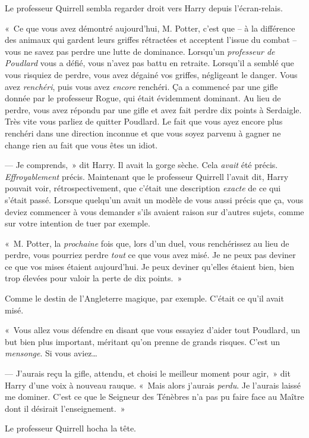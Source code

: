 Le professeur Quirrell sembla regarder droit vers Harry depuis l'écran-relais.

«~Ce que vous avez démontré aujourd'hui, M. Potter, c'est que -- à la différence des animaux qui gardent leurs griffes rétractées et acceptent l'issue du combat -- vous ne savez pas perdre une lutte de dominance. Lorsqu'un \emph{professeur de Poudlard} vous a défié, vous n'avez pas battu en retraite. Lorsqu'il a semblé que vous risquiez de perdre, vous avez dégainé vos griffes, négligeant le danger. Vous avez \emph{renchéri}, puis vous avez \emph{encore} renchéri. Ça a commencé par une gifle donnée par le professeur Rogue, qui était évidemment dominant. Au lieu de perdre, vous avez répondu par une gifle et avez fait perdre dix points à Serdaigle. Très vite vous parliez de quitter Poudlard. Le fait que vous ayez encore plus renchéri dans une direction inconnue et que vous soyez parvenu à gagner ne change rien au fait que vous êtes un idiot.

--- Je comprends,~» dit Harry. Il avait la gorge sèche. Cela \emph{avait} été précis. \emph{Effroyablement} précis. Maintenant que le professeur Quirrell l'avait dit, Harry pouvait voir, rétrospectivement, que c'était une description \emph{exacte} de ce qui s'était passé. Lorsque quelqu'un avait un modèle de vous aussi précis que ça, vous deviez commencer à vous demander s'ils avaient raison sur d'autres sujets, comme sur votre intention de tuer par exemple.

«~M. Potter, la \emph{prochaine} fois que, lors d'un duel, vous renchérissez au lieu de perdre, vous pourriez perdre \emph{tout} ce que vous avez misé. Je ne peux pas deviner ce que vos mises étaient aujourd'hui. Je peux deviner qu'elles étaient bien, bien trop élevées pour valoir la perte de dix points.~»

Comme le destin de l'Angleterre magique, par exemple. C'était ce qu'il avait misé.

«~Vous allez vous défendre en disant que vous essayiez d'aider tout Poudlard, un but bien plus important, méritant qu'on prenne de grands risques. C'est un \emph{mensonge}. Si vous aviez…

--- J'aurais reçu la gifle, attendu, et choisi le meilleur moment pour agir,~» dit Harry d'une voix à nouveau rauque. «~Mais alors j'aurais \emph{perdu}. Je l'aurais laissé me dominer. C'est ce que le Seigneur des Ténèbres n'a pas pu faire face au Maître dont il désirait l'enseignement.~»

Le professeur Quirrell hocha la tête.

